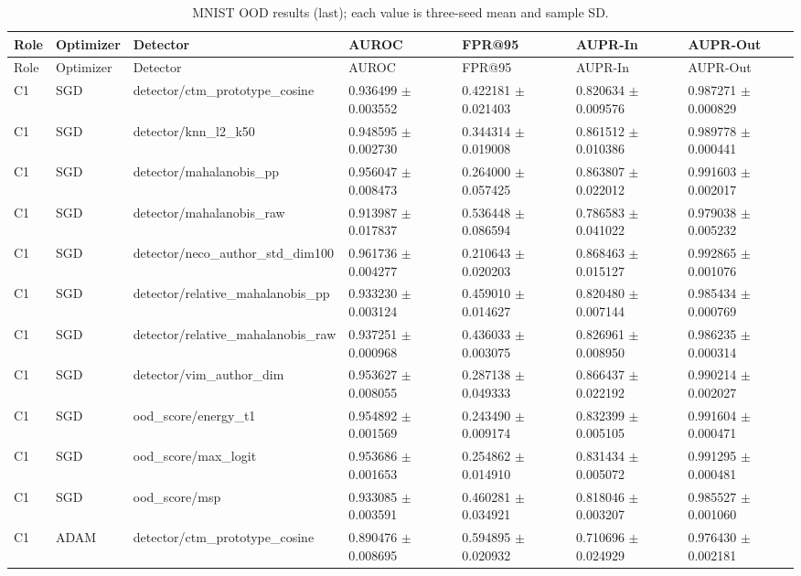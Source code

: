 \begin{longtable}{lllllll}
\caption{MNIST OOD results (last); each value is three-seed mean and sample SD.}\\
Role & Optimizer & Detector & AUROC & FPR@95 & AUPR-In & AUPR-Out \\
\hline
\endfirsthead
Role & Optimizer & Detector & AUROC & FPR@95 & AUPR-In & AUPR-Out \\
\hline
\endhead
C1 & SGD & detector/ctm\_prototype\_cosine & 0.936499 $\pm$ 0.003552 & 0.422181 $\pm$ 0.021403 & 0.820634 $\pm$ 0.009576 & 0.987271 $\pm$ 0.000829 \\
C1 & SGD & detector/knn\_l2\_k50 & 0.948595 $\pm$ 0.002730 & 0.344314 $\pm$ 0.019008 & 0.861512 $\pm$ 0.010386 & 0.989778 $\pm$ 0.000441 \\
C1 & SGD & detector/mahalanobis\_pp & 0.956047 $\pm$ 0.008473 & 0.264000 $\pm$ 0.057425 & 0.863807 $\pm$ 0.022012 & 0.991603 $\pm$ 0.002017 \\
C1 & SGD & detector/mahalanobis\_raw & 0.913987 $\pm$ 0.017837 & 0.536448 $\pm$ 0.086594 & 0.786583 $\pm$ 0.041022 & 0.979038 $\pm$ 0.005232 \\
C1 & SGD & detector/neco\_author\_std\_dim100 & 0.961736 $\pm$ 0.004277 & 0.210643 $\pm$ 0.020203 & 0.868463 $\pm$ 0.015127 & 0.992865 $\pm$ 0.001076 \\
C1 & SGD & detector/relative\_mahalanobis\_pp & 0.933230 $\pm$ 0.003124 & 0.459010 $\pm$ 0.014627 & 0.820480 $\pm$ 0.007144 & 0.985434 $\pm$ 0.000769 \\
C1 & SGD & detector/relative\_mahalanobis\_raw & 0.937251 $\pm$ 0.000968 & 0.436033 $\pm$ 0.003075 & 0.826961 $\pm$ 0.008950 & 0.986235 $\pm$ 0.000314 \\
C1 & SGD & detector/vim\_author\_dim & 0.953627 $\pm$ 0.008055 & 0.287138 $\pm$ 0.049333 & 0.866437 $\pm$ 0.022192 & 0.990214 $\pm$ 0.002027 \\
C1 & SGD & ood\_score/energy\_t1 & 0.954892 $\pm$ 0.001569 & 0.243490 $\pm$ 0.009174 & 0.832399 $\pm$ 0.005105 & 0.991604 $\pm$ 0.000471 \\
C1 & SGD & ood\_score/max\_logit & 0.953686 $\pm$ 0.001653 & 0.254862 $\pm$ 0.014910 & 0.831434 $\pm$ 0.005072 & 0.991295 $\pm$ 0.000481 \\
C1 & SGD & ood\_score/msp & 0.933085 $\pm$ 0.003591 & 0.460281 $\pm$ 0.034921 & 0.818046 $\pm$ 0.003207 & 0.985527 $\pm$ 0.001060 \\
C1 & ADAM & detector/ctm\_prototype\_cosine & 0.890476 $\pm$ 0.008695 & 0.594895 $\pm$ 0.020932 & 0.710696 $\pm$ 0.024929 & 0.976430 $\pm$ 0.002181 \\

\end{longtable}
